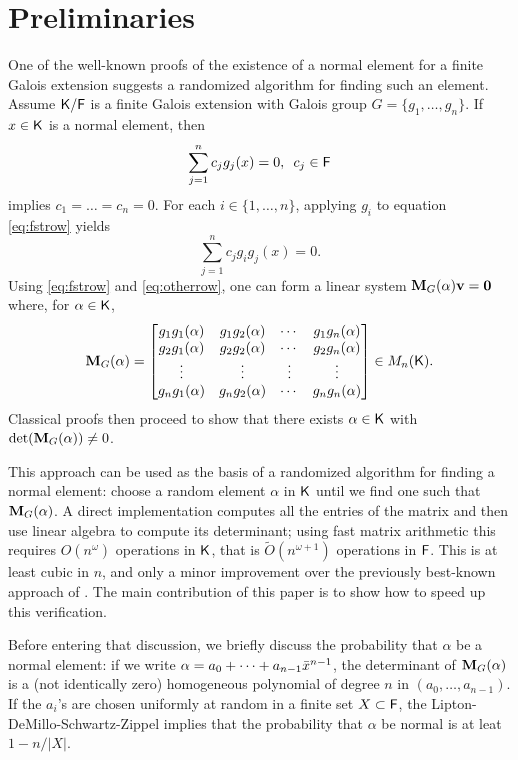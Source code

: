 \section{Preliminaries}
\label{sec:pre}

One of the well-known proofs of the existence of a normal element for a
finite Galois extension \cite[Theorem 6.13.1]{Lang} suggests a randomized
algorithm for finding such an element. Assume ${\mathsf{K}}/{\mathsf{F}}$ is a finite Galois
extension with Galois group $G = \lbrace g_1 , \ldots , g_n \rbrace$. If
$x \in {\mathsf{K}}$ is a normal element, then
\begin{equation}
  \label{eq:fstrow}
  \sum_{j=1}^n 
  c_j g_j(x)=0, \,\,\, c_j \in {\mathsf{F}} 
\end{equation} 
implies $c_1 =\ldots=c_n = 0$. For each
$i \in \lbrace 1, \ldots , n\rbrace$, applying $g_i$ to equation
\eqref{eq:fstrow} yields
\begin{equation} \label{eq:otherrow} \sum_{j=1}^n c_j g_i g_j(x)=0.
\end{equation}
Using \eqref{eq:fstrow} and \eqref{eq:otherrow}, one can form a linear
system $\mat{M}_G(\alpha)\textbf{v} = \textbf{0}$ where, for $\alpha\in{\mathsf{K}}$,
\[
  \mat M_G(\alpha) =
  \begin{bmatrix}
    g_1 g_1(\alpha) & g_1 g_2(\alpha) & \cdots & g_1 g_n(\alpha) \\
    g_2 g_1(\alpha) & g_2 g_2(\alpha) & \cdots & g_2 g_n(\alpha) \\
    \vdots		& \vdots	& \vdots & \vdots \\
    g_n g_1(\alpha) & g_n g_2(\alpha) & \cdots & g_n g_n(\alpha) \\
  \end{bmatrix} \in M_n(\K).
\]
Classical proofs then proceed to show that there exists $\alpha \in {\mathsf{K}}$
with $\det(\mat M_G(\alpha))\neq 0$.
 
This approach can be used as the basis of a randomized algorithm for
finding a normal element: choose a random element $\alpha$ in ${\mathsf{K}}$ until we
find one such that $ \mat M_G(\alpha)$. A direct implementation computes
all the entries of the matrix and then use linear algebra to compute its
determinant; using fast matrix arithmetic this requires $O(n^\omega)$
operations in ${\mathsf{K}}$, that is $\tilde{O}(n^{\omega+1})$ operations in
${\mathsf{F}}$. This is at least cubic in $n$, and only a minor improvement over the
previously best-known approach of . The main contribution
of this paper is to show how to speed up this verification.
 
Before entering that discussion, we briefly discuss the probability that
$\alpha$ be a normal element: if we write
$\alpha = a_0 + \cdots + a_{n-1} {\bar x}^{n-1}$, the determinant of
$\mat M_G(\alpha)$ is a (not identically zero) homogeneous polynomial of
degree $n$ in $(a_0,\dots,a_{n-1})$. If the $a_i$'s are chosen uniformly at
random in a finite set $X \subset {\mathsf{F}}$, the Lipton-DeMillo-Schwartz-Zippel
implies that the probability that $\alpha$ be normal is at leat $1-n/|X|$.

